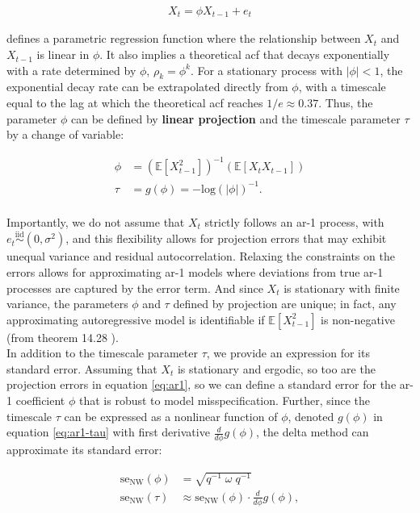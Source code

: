 \documentclass[main.tex]{subfiles}
\begin{document}
\begin{align}\label{eq:ar1}
    X_t = \phi X_{t-1} + e_t
\end{align}

defines a parametric regression function where the relationship between $X_t$ and $X_{t-1}$ is linear in $\phi$. It also implies a theoretical acf that decays exponentially with a rate determined by $\phi$, $\rho_k = \phi^k$. For a stationary process with $|\phi|<1$, the exponential decay rate can be extrapolated directly from $\phi$, with a timescale equal to the lag at which the theoretical acf reaches $1/e \approx 0.37$. Thus, the parameter $\phi$ can be defined by \textbf{linear projection} and the timescale parameter $\tau$ by a change of variable:

\begin{align}
    \phi &= (\mathbb{E}[X_{t-1}^2])^{-1}(\mathbb{E}[X_t X_{t-1}]) \label{eq:ar1-phi}\\
    \tau &= g(\phi) = -{\text{log}(|\phi|)}^{-1}. \label{eq:ar1-tau}
\end{align}
\\

Importantly, we do not assume that $X_t$ strictly follows an ar-1 process, with $e_t \overset{\text{iid}}{\sim} (0, \sigma^2)$, and this flexibility allows for projection errors that may exhibit unequal variance and residual autocorrelation. Relaxing the constraints on the errors allows for approximating ar-1 models where deviations from true ar-1 processes are captured by the error term. And since $X_t$ is stationary with finite variance, the parameters $\phi$ and $\tau$ defined by projection are unique; in fact, any approximating autoregressive model is identifiable if $\mathbb{E}[X_{t-1}^2]$ is non-negative (from theorem 14.28 \cite{hansen_econometrics_2022}).\\

In addition to the timescale parameter $\tau$, we provide an expression for its standard error. Assuming that $X_t$ is stationary and ergodic, so too are the projection errors in equation \eqref{eq:ar1}, so we can define a standard error for the ar-1 coefficient $\phi$ that is robust to model misspecification. Further, since the timescale $\tau$ can be expressed as a nonlinear function of $\phi$, denoted $g(\phi)$ in equation \eqref{eq:ar1-tau} with first derivative $\frac{d}{d\phi} g(\phi)$, the delta method can approximate its standard error:

\begin{align}
    \text{se}_{\text{NW}}(\phi) &= \sqrt{q^{-1}\; \omega \; q^{-1}} \label{eq:se-ar1-phi}\\
    \text{se}_{\text{NW}}(\tau) &\approx \text{se}_{\text{NW}}(\phi) \cdot \frac{d}{d\phi} g(\phi),
\end{align}
\end{document}
